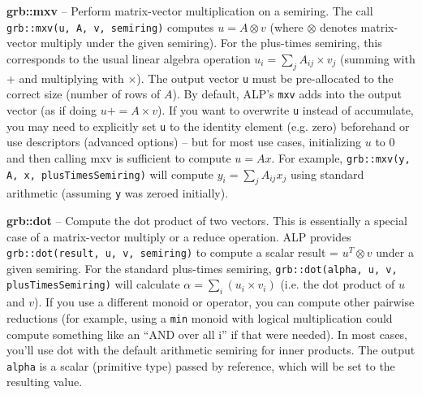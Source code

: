     \textbf{grb::mxv} – Perform matrix-vector multiplication on a semiring. The call \texttt{grb::mxv(u, A, v, semiring)} computes $u = A \otimes v$ (where $\otimes$ denotes matrix-vector multiply under the given semiring). For the plus-times semiring, this corresponds to the usual linear algebra operation $u_i = \sum_j A_{ij} \times v_j$ (summing with + and multiplying with $\times$). The output vector \texttt{u} must be pre-allocated to the correct size (number of rows of $A$). By default, ALP’s \texttt{mxv} adds into the output vector (as if doing $u += A \times v$). If you want to overwrite \texttt{u} instead of accumulate, you may need to explicitly set \texttt{u} to the identity element (e.g. zero) beforehand or use descriptors (advanced options) – but for most use cases, initializing $u$ to 0 and then calling mxv is sufficient to compute $u = A x$. For example, \texttt{grb::mxv(y, A, x, plusTimesSemiring)} will compute $y_i = \sum_j A_{ij} x_j$ using standard arithmetic (assuming \texttt{y} was zeroed initially).
\newline

      \textbf{grb::dot} – Compute the dot product of two vectors. This is essentially a special case of a matrix-vector multiply or a reduce operation. ALP provides \texttt{grb::dot(result, u, v, semiring)} to compute a scalar result = $u^T \otimes v$ under a given semiring. For the standard plus-times semiring, \texttt{grb::dot(alpha, u, v, plusTimesSemiring)} will calculate $\alpha = \sum_i (u_i \times v_i)$ (i.e. the dot product of $u$ and $v$). If you use a different monoid or operator, you can compute other pairwise reductions (for example, using a \texttt{min} monoid with logical multiplication could compute something like an “AND over all i” if that were needed). In most cases, you'll use dot with the default arithmetic semiring for inner products. The output \texttt{alpha} is a scalar (primitive type) passed by reference, which will be set to the resulting value.
\newline

